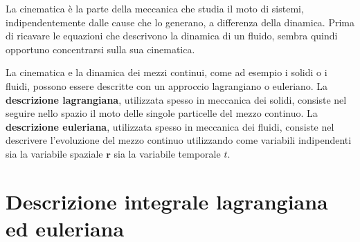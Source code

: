La cinematica è la parte della meccanica che studia il moto di sistemi, indipendentemente dalle cause che lo generano, a differenza della dinamica. Prima di ricavare le equazioni che descrivono la dinamica di un fluido, sembra quindi opportuno concentrarsi sulla sua cinematica.

La cinematica e la dinamica dei mezzi continui, come ad esempio i solidi o i fluidi, possono essere descritte con un approccio lagrangiano o euleriano. La \textbf{descrizione lagrangiana}, utilizzata spesso in meccanica dei solidi, consiste nel seguire nello spazio il moto delle singole particelle del mezzo continuo. La \textbf{descrizione euleriana}, utilizzata spesso in meccanica dei fluidi, consiste nel descrivere l'evoluzione del mezzo continuo utilizzando come variabili indipendenti sia la variabile spaziale $\bm{r}$ sia la variabile temporale $t$.


\section{Descrizione integrale lagrangiana ed euleriana}

